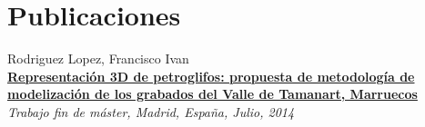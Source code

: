 \documentclass[]{friggeri-cv}
\begin{document}
\section{Publicaciones}
Rodriguez Lopez, Francisco Ivan\\
\textbf{{\href{http://oa.upm.es/30703/}{Representación 3D de petroglifos: propuesta de metodología de modelización de los grabados del Valle de Tamanart, Marruecos}}}\\
\emph{Trabajo fin de máster, Madrid, España, Julio, 2014}
% 
\end{document}
